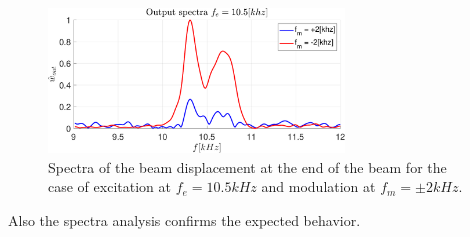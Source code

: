 \begin{figure}[H]
    \centering
    \includegraphics[width=0.7\textwidth]{img/MATLAB/Spectra_narrow10p5kHz_2000.pdf}
    \caption{Spectra of the beam displacement at the end of the beam for the case of excitation at $f_e = 10.5 kHz$ and modulation at $f_m = \pm 2 kHz$.}
    \label{fig:nonreciprocal_behavior_10p5kHz_spectra}
\end{figure}

Also the spectra analysis confirms the expected behavior.


